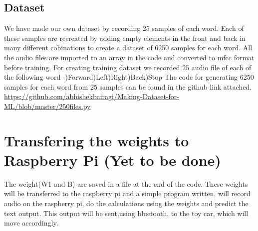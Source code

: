 \documentclass[journal,12pt,twocolumn]{IEEEtran}
\begin{document}
\subsection{Dataset}
We have made our own dataset by recording 25 samples of each word. Each of these samples are recreated by adding empty elements in the front and back in many different cobinations to create a dataset of 6250 samples for each word. All the audio files are imported to an array in the code and converted to mfcc format before training. For creating training dataset we recorded 25 audio file of each of the following word -)Forward)Left)Right)Back)Stop\newline
The code for generating 6250 samples for each word from 25 samples can be found in the github link attached.\newline
\url{https://github.com/abhishekbairagi/Making-Dataset-for-ML/blob/master/250files.py}



\section{Transfering the weights to Raspberry Pi (Yet to be done)}
The weight(W1 and B) are saved in a file at the end of the code. These weights will be transferred to the raspberry pi and a simple program written, will record audio on the raspberry pi, do the calculations using the weights and predict the text output. This output will be sent,using bluetooth, to the toy car, which will move accordingly.
\end{document}
